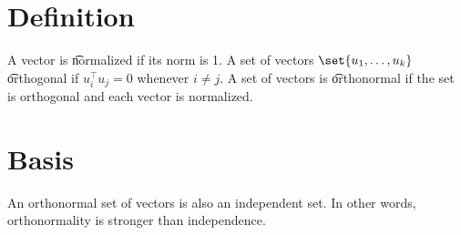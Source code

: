 

\section*{Definition}

A vector is \t{normalized} if its norm is 1.
A set of vectors $\set{u_1, \dots , u_k}$ \t{orthogonal} if $u_i^\top  u_j = 0$ whenever $i \neq j$.
A set of vectors is \t{orthonormal} if the set is orthogonal and each vector is normalized.

\section*{Basis}

An orthonormal set of vectors is also an independent set.
In other words, orthonormality is stronger than independence.

\blankpage